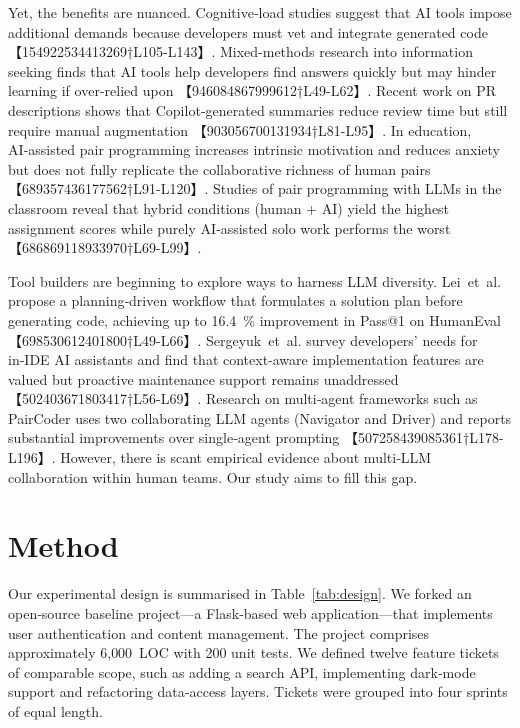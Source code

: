 \documentclass[conference]{IEEEtran}
\begin{document}
Yet, the benefits are nuanced.  Cognitive‑load studies suggest that AI tools impose additional demands because developers must vet and integrate generated code 【154922534413269†L105-L143】.  Mixed‑methods research into information seeking finds that AI tools help developers find answers quickly but may hinder learning if over‑relied upon 【946084867999612†L49-L62】.  Recent work on PR descriptions shows that Copilot‑generated summaries reduce review time but still require manual augmentation 【903056700131934†L81-L95】.  In education, AI‑assisted pair programming increases intrinsic motivation and reduces anxiety but does not fully replicate the collaborative richness of human pairs 【689357436177562†L91-L120】.  Studies of pair programming with LLMs in the classroom reveal that hybrid conditions (human + AI) yield the highest assignment scores while purely AI‑assisted solo work performs the worst 【686869118933970†L69-L99】.

Tool builders are beginning to explore ways to harness LLM diversity.  Lei et al. propose a planning‑driven workflow that formulates a solution plan before generating code, achieving up to 16.4 \% improvement in Pass@1 on HumanEval 【698530612401800†L49-L66】.  Sergeyuk et al. survey developers’ needs for in‑IDE AI assistants and find that context‑aware implementation features are valued but proactive maintenance support remains unaddressed 【502403671803417†L56-L69】.  Research on multi‑agent frameworks such as PairCoder uses two collaborating LLM agents (Navigator and Driver) and reports substantial improvements over single‑agent prompting 【507258439085361†L178-L196】.  However, there is scant empirical evidence about multi‑LLM collaboration within human teams.  Our study aims to fill this gap.

\section{Method}
Our experimental design is summarised in Table~\ref{tab:design}.  We forked an open‑source baseline project—a Flask‑based web application—that implements user authentication and content management.  The project comprises approximately 6{,}000 LOC with 200 unit tests.  We defined twelve feature tickets of comparable scope, such as adding a search API, implementing dark‑mode support and refactoring data‑access layers.  Tickets were grouped into four sprints of equal length.
\end{document}
